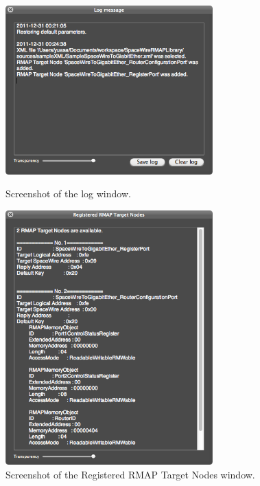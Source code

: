 \documentclass[a4paper,10pt]{article}
\begin{document}
\begin{figure}[htb]
\begin{center}
\begin{minipage}{0.45\hsize}
\begin{center}
\includegraphics[width=8cm]{figures/SpaceWireRMAPGUI/Screenshot_LogWhenLoadingConfigurationFile.png}
\caption{Screenshot of the log window.}
\label{figure:LogWindow}
\end{center}
\end{minipage}
\hspace{0.05\hsize}
\begin{minipage}{0.45\hsize}
\begin{center}
\includegraphics[width=8cm]{figures/SpaceWireRMAPGUI/Screenshot_RegisteredRMAPTargetNodesWhenLoadingConfigurationFile.png}
\caption{Screenshot of the Registered RMAP Target Nodes window.}
\label{figure:RegisteredRMAPTargetNodesWhenLoadingConfigurationFile}
\end{center}
\end{minipage}
\end{center}
\end{figure}
\end{document}
